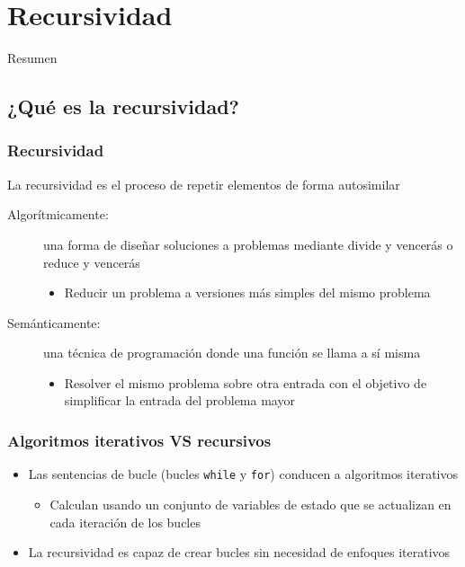 \documentclass[11pt]{beamer}
\begin{document}
	\section{Recursividad}

	\begin{frame}{Resumen}
	\end{frame}

	\subsection{¿Qué es la recursividad?}
	\begin{frame}\frametitle{Recursividad}
	\begin{block}{}
	La recursividad es el proceso de repetir elementos de forma autosimilar
	\end{block}
	\begin{description}
	\item[Algorítmicamente:] una forma de diseñar soluciones a problemas mediante divide y vencerás o reduce y vencerás
	\begin{itemize}
		\item Reducir un problema a versiones más simples del mismo problema
	\end{itemize}
	\item[Semánticamente:] una técnica de programación donde una función se llama a sí misma
	\begin{itemize}
		\item Resolver el mismo problema sobre otra entrada con el objetivo de simplificar la entrada del problema mayor
	\end{itemize}
	\end{description}
	\end{frame}

	\begin{frame}\frametitle{Algoritmos iterativos VS recursivos}
	\begin{itemize}
	\item Las sentencias de bucle (bucles \texttt{while} y \texttt{for}) conducen a algoritmos iterativos
	\begin{itemize}
		\item Calculan usando un conjunto de variables de estado que se actualizan en cada iteración de los bucles
	\end{itemize}
	\item La recursividad es capaz de crear bucles sin necesidad de enfoques iterativos
	\end{itemize}
	\end{frame}
\end{document}
